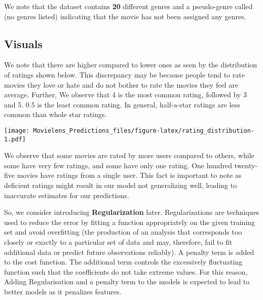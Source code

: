 \documentclass[
]{article}
\begin{document}
We note that the dataset contains \textbf{20} different genres and a
pseudo-genre called (no genres listed) indicating that the movie has not
been assigned any genres.

\pagebreak

\hypertarget{visuals}{%
\subsection{Visuals}\label{visuals}}

We note that there are higher compared to lower ones as seen by the
distribution of ratings shown below. This discrepancy may be because
people tend to rate movies they love or hate and do not bother to rate
the movies they feel are average. Further, We observe that 4 is the most
common rating, followed by 3 and 5. 0.5 is the least common rating. In
general, half-a-star ratings are less common than whole star ratings.

\texttt{[image: Movielens\_Predictions\_files/figure-latex/rating\_distribution-1.pdf]}

We observe that some movies are rated by more users compared to others,
while some have very few ratings, and some have only one rating. One
hundred twenty-five movies have ratings from a single user. This fact is
important to note as deficient ratings might result in our model not
generalizing well, leading to inaccurate estimates for our predictions.

So, we consider introducing \textbf{Regularization} later.
Regularizations are techniques used to reduce the error by fitting a
function appropriately on the given training set and avoid overfitting
(the production of an analysis that corresponds too closely or exactly
to a particular set of data and may, therefore, fail to fit additional
data or predict future observations reliably). A penalty term is added
to the cost function. The additional term controls the excessively
fluctuating function such that the coefficients do not take extreme
values. For this reason, Adding Regularisation and a penalty term to the
models is expected to lead to better models as it penalizes features.
\end{document}
